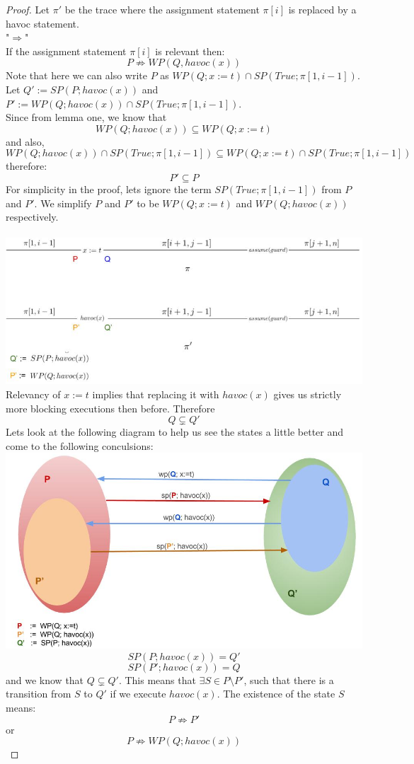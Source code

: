 \documentclass{article}
\newcommand{\limp}{\Rightarrow}
\begin{document}
\begin{proof}
Let $\pi'$ be the trace where the assignment statement $\pi[i]$ is replaced by a havoc statement. \\
"$\Rightarrow$" \\
If the assignment statement $\pi[i]$ is relevant then:
$$P \not \limp WP(Q,havoc(x))$$
Note that here we can also write $P$ as $WP(Q; x:=t) \cap SP(True; \pi[1, i-1])$.\\
Let $Q' := SP(P; havoc(x))$ and $P' := WP(Q;havoc(x)) \cap SP(True; \pi[1, i-1])$. \\
Since from lemma one, we know that 
$$WP(Q; havoc(x)) \subseteq WP(Q; x:=t)$$
and also,
$$WP(Q; havoc(x)) \cap SP(True; \pi[1, i-1])  \subseteq WP(Q; x:=t) \cap SP(True; \pi[1, i-1])$$
therefore:
$$P' \subseteq P$$
For simplicity in the proof, lets ignore the term $SP(True; \pi[1, i-1])$ from $P$ and $P'$. We simplify $P$ and $P'$ to be $WP(Q; x:=t)$ and $WP(Q; havoc(x))$ respectively. \\
\\
\includegraphics[width=\linewidth]{traces.jpg}\\
Relevancy of $x:=t$ implies that replacing it with $havoc(x)$ gives us strictly more blocking executions then before. Therefore
$$Q \subsetneq Q'$$
\newpage
Lets look at the following diagram to help us see the states a little better and come to the following conculsions:\\
\includegraphics[width=\linewidth]{states.jpg}\\
$$SP(P; havoc(x)) = Q'$$
$$SP(P'; havoc(x)) = Q$$
and we know that $Q \subsetneq Q'$. This means that $\exists S \in P \setminus P'$, such that there is a transition from $S$ to $Q'$ if we execute $havoc(x)$. The existence of the state $S$ means:
$$P \not \limp P'$$
or
$$P \not \limp WP(Q; havoc(x))$$
\end{proof}
\end{document}
